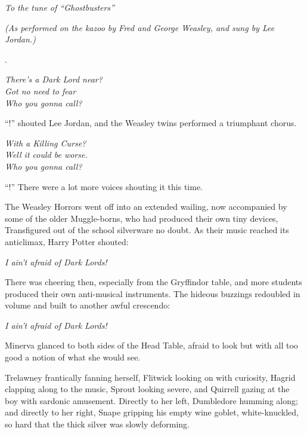 \begin{center}
\emph{To the tune of “Ghostbusters”}

\emph{(As performed on the kazoo by Fred and George Weasley,
and sung by Lee Jordan.)}

.

\emph{There’s a Dark Lord near?\\
Got no need to fear\\
Who you gonna call?}
\end{center}

“!” shouted Lee Jordan, and the Weasley twins performed a triumphant chorus.

\begin{center}
\emph{With a Killing Curse?\\
Well it could be worse.\\
Who you gonna call?}
\end{center}

“!” There were a lot more voices shouting it this time.

The Weasley Horrors went off into an extended wailing, now accompanied by some of the older Muggle-borns, who had produced their own tiny devices, Transfigured out of the school silverware no doubt. As their music reached its anticlimax, Harry Potter shouted:

\begin{center}
\emph{I ain’t afraid of Dark Lords!}
\end{center}

There was cheering then, especially from the Gryffindor table, and more students produced their own anti-musical instruments. The hideous buzzings redoubled in volume and built to another awful crescendo:

\begin{center}
\emph{I ain’t afraid of Dark Lords!}
\end{center}

Minerva glanced to both sides of the Head Table, afraid to look but with all too good a notion of what she would see.

Trelawney frantically fanning herself, Flitwick looking on with curiosity, Hagrid clapping along to the music, Sprout looking severe, and Quirrell gazing at the boy with sardonic amusement. Directly to her left, Dumbledore humming along; and directly to her right, Snape gripping his empty wine goblet, white-knuckled, so hard that the thick silver was slowly deforming.

